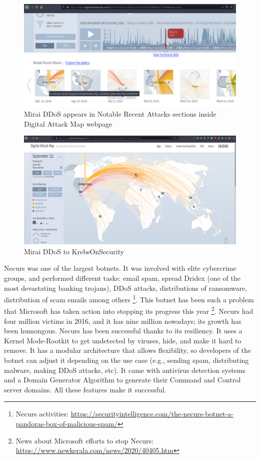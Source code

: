 \documentclass[11pt, a4paper,twoside]{tesi_upf}
\begin{document}
\begin{figure}
    \centering
    \includegraphics[width=\linewidth]{images/ddosmap-index.png}
    \caption{Mirai DDoS appears in Notable Recent Attacks sections inside Digital Attack Map webpage}
    \label{fig:digital-attack-map-notable-attacks}
\end{figure}

\begin{figure}
    \centering
    \includegraphics[width=\linewidth]{images/kreb-on-security.png}
    \caption{Mirai DDoS to KrebsOnSecurity}
    \label{fig:mirai-ddos}
\end{figure}

Necurs was one of the largest botnets. It was involved with elite cybercrime groups, and performed different tasks: email spam, spread Dridex (one of the most devastating banking trojans), DDoS attacks, distributions of ransomware, distribution of scam emails among others \footnote{Necurs activities: \url{https://securityintelligence.com/the-necurs-botnet-a-pandoras-box-of-malicious-spam/}}. This botnet has been such a problem that Microsoft has taken action into stopping its progress this year \footnote{News about Microsoft efforts to stop Necurs: \url{https://www.newkerala.com/news/2020/40405.htm}}. Necurs had four million victims in 2016, and it has nine million nowadays; its growth has been humongous. Necurs has been successful thanks to its resiliency. It uses a Kernel Mode-Rootkit to get undetected by viruses, hide, and make it hard to remove. It has a modular architecture that allows flexibility, so developers of the botnet can adjust it depending on the use case (e.g., sending spam, distributing malware, making DDoS attacks, etc). It came with antivirus detection systems and a Domain Generator Algorithm to generate their Command and Control server domains. All these features make it successful.
\end{document}
